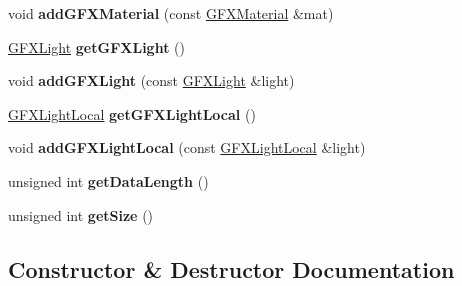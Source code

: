 \begin{DoxyCompactItemize}
\item 
void {\bfseries add\+G\+F\+X\+Material} (const \hyperlink{structGFXMaterial}{G\+F\+X\+Material} \&mat)\hypertarget{classNetBuffer_acf50d785c70cd335df80f2536f5b954a}{}\label{classNetBuffer_acf50d785c70cd335df80f2536f5b954a}

\item 
\hyperlink{classGFXLight}{G\+F\+X\+Light} {\bfseries get\+G\+F\+X\+Light} ()\hypertarget{classNetBuffer_a6f2b42ade6c49d8d2baee98a09445d18}{}\label{classNetBuffer_a6f2b42ade6c49d8d2baee98a09445d18}

\item 
void {\bfseries add\+G\+F\+X\+Light} (const \hyperlink{classGFXLight}{G\+F\+X\+Light} \&light)\hypertarget{classNetBuffer_a7261de2026576126b4281bfb252d21f6}{}\label{classNetBuffer_a7261de2026576126b4281bfb252d21f6}

\item 
\hyperlink{structGFXLightLocal}{G\+F\+X\+Light\+Local} {\bfseries get\+G\+F\+X\+Light\+Local} ()\hypertarget{classNetBuffer_a1ff91eedaf9667a71b3468eb162cef0b}{}\label{classNetBuffer_a1ff91eedaf9667a71b3468eb162cef0b}

\item 
void {\bfseries add\+G\+F\+X\+Light\+Local} (const \hyperlink{structGFXLightLocal}{G\+F\+X\+Light\+Local} \&light)\hypertarget{classNetBuffer_a9fbf33238470ff2f1b01f4dab43688f9}{}\label{classNetBuffer_a9fbf33238470ff2f1b01f4dab43688f9}

\item 
unsigned int {\bfseries get\+Data\+Length} ()\hypertarget{classNetBuffer_a70930126889da762c1a6f7ea26177646}{}\label{classNetBuffer_a70930126889da762c1a6f7ea26177646}

\item 
unsigned int {\bfseries get\+Size} ()\hypertarget{classNetBuffer_ab5211d0b217ee830f1729441428907c0}{}\label{classNetBuffer_ab5211d0b217ee830f1729441428907c0}

\end{DoxyCompactItemize}


\subsection{Constructor \& Destructor Documentation}
